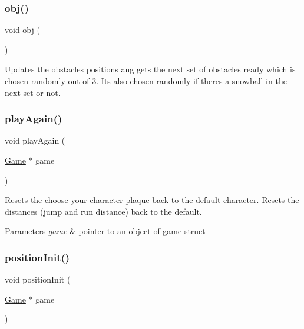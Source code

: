 \subsubsection{\texorpdfstring{obj()}{obj()}}
{\footnotesize\ttfamily void obj (\begin{DoxyParamCaption}{ }\end{DoxyParamCaption})}



Updates the obstacles positions ang gets the next set of obstacles ready which is chosen randomly out of 3. It\textquotesingle{}s also chosen randomly if there\textquotesingle{}s a snowball in the next set or not. 

\mbox{\label{group___graphics_gaaa565b7e974eec01db91380f3ba991d2}} 
\subsubsection{\texorpdfstring{play\+Again()}{playAgain()}}
{\footnotesize\ttfamily void play\+Again (\begin{DoxyParamCaption}\item[{\hyperlink{struct_game}{Game} $\ast$}]{game }\end{DoxyParamCaption})}



Resets the choose your character plaque back to the default character. Resets the distances (jump and run distance) back to the default. 


\begin{DoxyParams}{Parameters}
{\em game} & pointer to an object of game struct \\
\hline
\end{DoxyParams}
\mbox{\label{group___graphics_ga2b9d84216dd1b37a440ca6b71784c2fc}} 
\subsubsection{\texorpdfstring{position\+Init()}{positionInit()}}
{\footnotesize\ttfamily void position\+Init (\begin{DoxyParamCaption}\item[{\hyperlink{struct_game}{Game} $\ast$}]{game }\end{DoxyParamCaption})}



